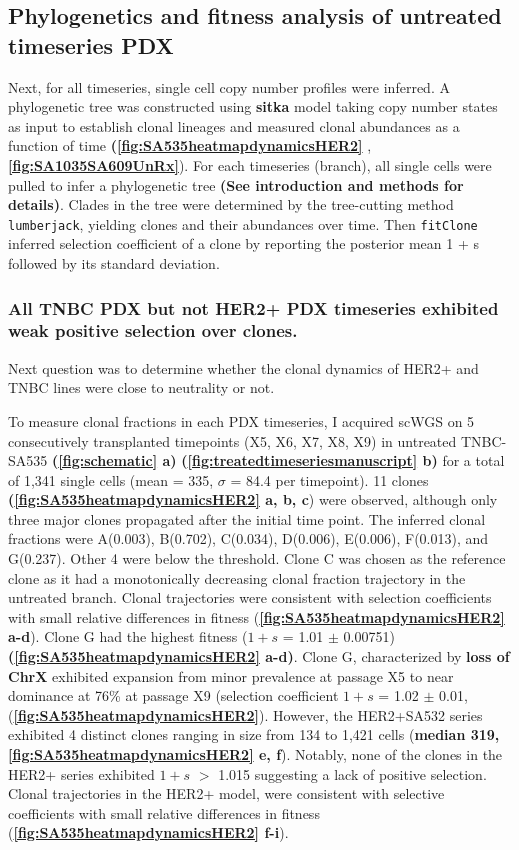 \subsection{Phylogenetics and fitness analysis of untreated timeseries PDX}
 Next, for all timeseries, single cell copy number profiles were inferred. A phylogenetic tree was constructed using \textbf{sitka} model taking copy number states as input to establish clonal lineages and measured clonal abundances as a function of time \textbf{(\autoref{fig:SA535heatmapdynamicsHER2} }, \textbf{\autoref{fig:SA1035SA609UnRx}}). For each timeseries (branch),   all single cells were pulled to infer a phylogenetic tree \textbf{(See introduction and methods for details)}. Clades in the tree were determined by the tree-cutting method \texttt{lumberjack}, yielding clones and their abundances over time. Then \texttt{fitClone} inferred selection coefficient of a clone by reporting the posterior mean 1 + s followed by its standard deviation.

\subsubsection{All TNBC PDX but not HER2+ PDX timeseries exhibited weak positive selection over clones.}
Next question was to determine whether the clonal dynamics of HER2+ and TNBC lines were close to neutrality or not.

To measure clonal fractions in each PDX timeseries, I acquired scWGS on 5 consecutively transplanted timepoints (X5, X6, X7, X8, X9) in untreated TNBC-SA535 \textbf{(\autoref{fig:schematic} a)} \textbf{(\autoref{fig:treatedtimeseriesmanuscript} b)} for a total of 1,341 single cells (mean = 335, $\sigma$ = 84.4 per timepoint).
11 clones \textbf{(\autoref{fig:SA535heatmapdynamicsHER2} a, b, c}) were observed, although only three major clones propagated after the initial time point.
The inferred clonal fractions were A(0.003), B(0.702), C(0.034), D(0.006), E(0.006), F(0.013), and G(0.237). Other 4 were below the threshold.
Clone C was chosen as the reference clone as it had a monotonically decreasing clonal fraction trajectory in the untreated branch. Clonal trajectories were consistent with selection coefficients
with small relative differences in fitness (\textbf{\autoref{fig:SA535heatmapdynamicsHER2} a-d}). Clone G had the highest fitness ($1+s$ = 1.01 $\pm$ 0.00751) \textbf{(\autoref{fig:SA535heatmapdynamicsHER2} a-d)}. 
 Clone G, characterized by \textbf{loss of ChrX} exhibited expansion from minor prevalence at passage X5 to near dominance at 76\% at passage X9 (selection coefficient $1+s$ = 1.02  $\pm$  0.01, (\textbf{\autoref{fig:SA535heatmapdynamicsHER2}}). 
 However, the HER2+SA532 series exhibited 4 distinct clones ranging in size from 134 to 1,421 cells (\textbf{median 319, \textbf{\autoref{fig:SA535heatmapdynamicsHER2} e, f}}). Notably, none of the clones in the HER2+ series exhibited $1+s$ $>$ 1.015 suggesting a lack of positive selection.
 Clonal trajectories in the HER2+ model, were consistent with selective coefficients with small relative differences in fitness (\textbf{\autoref{fig:SA535heatmapdynamicsHER2} f-i}).

